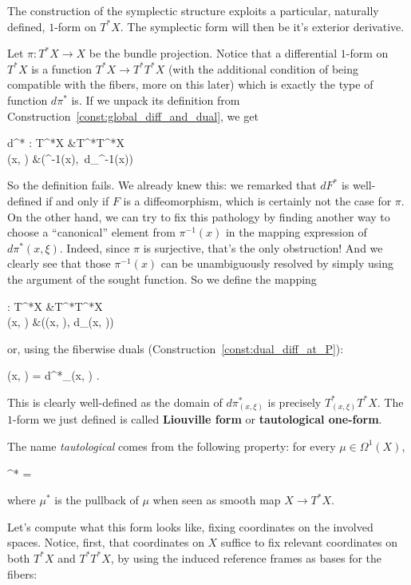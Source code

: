\documentclass[main.tex]{subfiles}
\begin{document}
The construction of the symplectic structure exploits a particular, naturally defined, $1$-form on $T^*X$. The symplectic form will then be it's exterior derivative.

\begin{construction}
	Let $\pi : T^*X \to X$ be the bundle projection. Notice that a differential $1$-form on $T^*X$ is a function $T^*X \to T^*T^*X$ (with the additional condition of being compatible with the fibers, more on this later) which is exactly the type of function $d\pi^*$ is. If we unpack its definition from Construction~\ref{const:global_diff_and_dual}, we get
	\begin{eqalign}
		d\pi^* : T^*X &\longto T^*T^*X\\
		(x, \xi) &\longmapsto (\pi^{-1}(x),\, \xi \circ d\pi_{\pi^{-1}(x)})
	\end{eqalign}
	So the definition fails. We already knew this: we remarked that $dF^*$ is well-defined if and only if $F$ is a diffeomorphism, which is certainly not the case for $\pi$. On the other hand, we can try to fix this pathology by finding another way to choose a ``canonical'' element from $\pi^{-1}(x)$ in the mapping expression of $d\pi^*(x, \xi)$. Indeed, since $\pi$ is surjective, that's the only obstruction! And we clearly see that those $\pi^{-1}(x)$ can be unambiguously resolved by simply using the argument of the sought function. So we define the mapping
	\begin{eqalign}
		\alpha : T^*X &\longto T^*T^*X\\
		(x, \xi) &\longmapsto ((x, \xi), \xi \circ d\pi_{(x, \xi)})
	\end{eqalign}
	or, using the fiberwise duals (Construction~\ref{const:dual_diff_at_P}):
	\begin{eqalign}
		\alpha(x, \xi) = d\pi^*_{(x, \xi)} \xi.
	\end{eqalign}
	This is clearly well-defined as the domain of $d\pi^*_{(x,\xi)}$ is precisely $T^*_{(x,\xi)} T^*X$. The $1$-form we just defined is called \textbf{Liouville form} or \textbf{tautological one-form}.
\end{construction}

The name \emph{tautological} comes from the following property: for every $\mu \in \Omega^1(X)$,
\begin{eqalign}
	\mu^* \alpha = \mu
\end{eqalign}
where $\mu^*$ is the pullback of $\mu$ when seen as smooth map $X \to T^*X$.

Let's compute what this form looks like, fixing coordinates on the involved spaces. Notice, first, that coordinates on $X$ suffice to fix relevant coordinates on both $T^*X$ and $T^*T^*X$, by using the induced reference frames as bases for the fibers:
\end{document}
